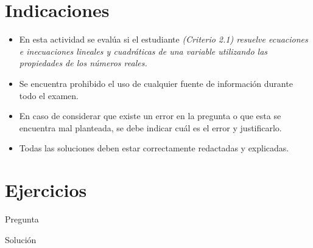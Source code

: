 \documentclass[11pt,a4]{aleph-examen}
\begin{document}
\encabezado

\section*{Indicaciones}
\begin{itemize}[leftmargin=*]
\item 
    En esta actividad se evalúa si el estudiante \textit{(Criterio 2.1) resuelve ecuaciones e inecuaciones lineales y cuadráticas de una variable utilizando las propiedades de los números reales.} 
\item
    Se encuentra prohibido el uso de cualquier fuente de información durante todo el examen.
\item
    En caso de considerar que existe un error en la pregunta o que esta se encuentra mal planteada, se debe indicar cuál es el error y justificarlo.
\item
    Todas las soluciones deben estar correctamente redactadas y explicadas.
\end{itemize}

\section*{Ejercicios}

\begin{preguntas}

\item
    Pregunta

\begin{respuesta}
    Solución
\end{respuesta}


\end{preguntas}
\end{document}
